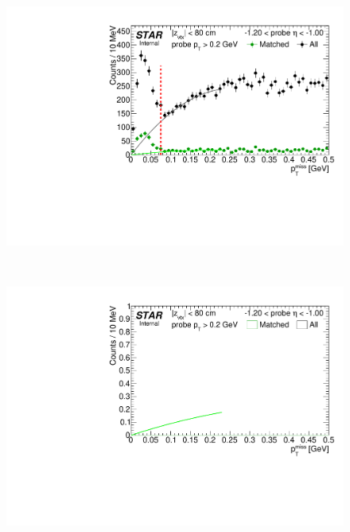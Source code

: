 \begin{figure}[ht]\ContinuedFloat
\centering
\parbox{0.495\textwidth}{
  \centering
  \includegraphics[width=\linewidth,page=11]{graphics/systematicsEfficiency/TOF_tagAndProbe/Fitting_effVsEta_data.pdf}
}~
\parbox{0.495\textwidth}{
  \centering
  \includegraphics[width=\linewidth,page=11]{graphics/systematicsEfficiency/TOF_tagAndProbe/Fitting_effVsEta_mc.pdf}
}%
\end{figure}

